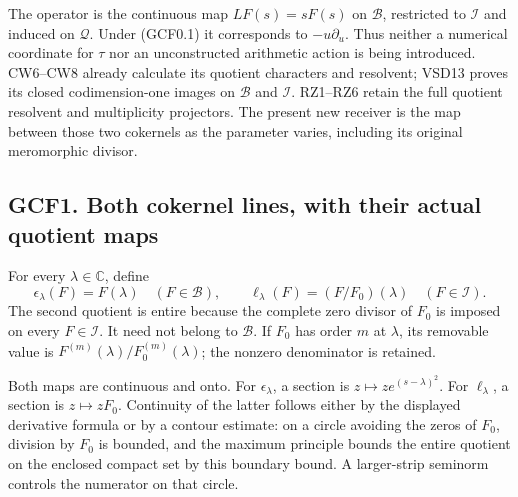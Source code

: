The operator is the continuous map \(LF(s)=sF(s)\) on \(\mathcal B\),
restricted to \(\mathcal I\) and induced on \(\mathcal Q\). Under
(GCF0.1) it corresponds to \(-u\partial_u\). Thus neither a numerical
coordinate for \(\tau\) nor an unconstructed arithmetic action is being
introduced. CW6--CW8 already calculate its quotient characters and
resolvent; VSD13 proves its closed codimension-one images on
\(\mathcal B\) and \(\mathcal I\). RZ1--RZ6 retain the full quotient
resolvent and multiplicity projectors. The present new receiver is the
map between those two cokernels as the parameter varies, including its
original meromorphic divisor.

\subsection{GCF1. Both cokernel lines, with their actual quotient
maps}\label{gcf1.-both-cokernel-lines-with-their-actual-quotient-maps}

For every \(\lambda\in\mathbb C\), define \[
\epsilon_\lambda(F)=F(\lambda)\quad(F\in\mathcal B),\qquad
\ell_\lambda(F)=(F/F_0)(\lambda)\quad(F\in\mathcal I).
\tag{GCF1.1}
\] The second quotient is entire because the complete zero divisor of
\(F_0\) is imposed on every \(F\in\mathcal I\). It need not belong to
\(\mathcal B\). If \(F_0\) has order \(m\) at \(\lambda\), its removable
value is \(F^{(m)}(\lambda)/F_0^{(m)}(\lambda)\); the nonzero
denominator is retained.

Both maps are continuous and onto. For \(\epsilon_\lambda\), a section
is \(z\mapsto z e^{(s-\lambda)^2}\). For \(\ell_\lambda\), a section is
\(z\mapsto zF_0\). Continuity of the latter follows either by the
displayed derivative formula or by a contour estimate: on a circle
avoiding the zeros of \(F_0\), division by \(F_0\) is bounded, and the
maximum principle bounds the entire quotient on the enclosed compact set
by this boundary bound. A larger-strip seminorm controls the numerator
on that circle.

